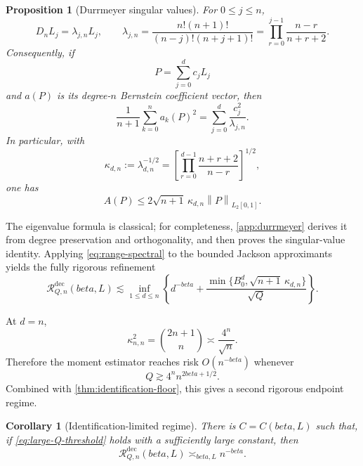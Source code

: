 \documentclass[11pt]{article}
\def\beta{beta}%
\newtheorem{proposition}[theorem]{Proposition}
\newtheorem{corollary}[theorem]{Corollary}
\newcommand{\calR}{\mathcal R}
\newcommand{\norm}[1]{\left\lVert#1\right\rVert}
\begin{document}
\begin{proposition}[Durrmeyer singular values]
\label{prop:durrmeyer}
For $0\le j\le n$,
\begin{equation}
\label{eq:durrmeyer-eigen}
D_nL_j=\lambda_{j,n}L_j,
\qquad
\lambda_{j,n}
=
\frac{n!(n+1)!}{(n-j)!(n+j+1)!}
=
\prod_{r=0}^{j-1}\frac{n-r}{n+r+2}.
\end{equation}
Consequently, if
\[
P=\sum_{j=0}^d c_jL_j
\]
and $a(P)$ is its degree-$n$ Bernstein coefficient vector, then
\begin{equation}
\label{eq:coefficient-spectral}
\frac1{n+1}\sum_{k=0}^n a_k(P)^2
=
\sum_{j=0}^d\frac{c_j^2}{\lambda_{j,n}}.
\end{equation}
In particular, with
\begin{equation}
\label{eq:kappa}
\kappa_{d,n}
:=
\lambda_{d,n}^{-1/2}
=
\left[
\prod_{r=0}^{d-1}\frac{n+r+2}{n-r}
\right]^{1/2},
\end{equation}
one has
\begin{equation}
\label{eq:range-spectral}
A(P)
\le
2\sqrt{n+1}\,\kappa_{d,n}\norm{P}_{L_2[0,1]}.
\end{equation}
\end{proposition}

The eigenvalue formula is classical; for completeness, \cref{app:durrmeyer} derives it from degree preservation and orthogonality, and then proves the singular-value identity.  Applying \eqref{eq:range-spectral} to the bounded Jackson approximants yields the fully rigorous refinement
\begin{equation}
\label{eq:spectral-upper}
\calR^{\mathrm{dec}}_{Q,n}(\beta,L)
\lesssim
\inf_{1\le d\le n}
\left\{
 d^{-\beta}
+
\frac{\min\{B_0^d,\sqrt{n+1}\,\kappa_{d,n}\}}{\sqrt Q}
\right\}.
\end{equation}

At $d=n$,
\[
\kappa_{n,n}^2
=
\binom{2n+1}{n}
\asymp
\frac{4^n}{\sqrt n}.
\]
Therefore the moment estimator reaches risk $O(n^{-\beta})$ whenever
\begin{equation}
\label{eq:large-Q-threshold}
Q
\gtrsim
4^n n^{2\beta+1/2}.
\end{equation}
Combined with \cref{thm:identification-floor}, this gives a second rigorous endpoint regime.

\begin{corollary}[Identification-limited regime]
\label{cor:identification-limited}
There is $C=C(\beta,L)$ such that, if \eqref{eq:large-Q-threshold} holds with a sufficiently large constant, then
\[
\calR^{\mathrm{dec}}_{Q,n}(\beta,L)
\asymp_{\beta,L}
n^{-\beta}.
\]
\end{corollary}
\end{document}
